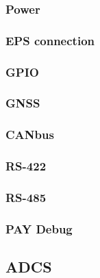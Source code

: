 \documentclass[10pt]{../datasheet}
\begin{document}
\subsubsection{Power}

\subsubsection{EPS connection}

\subsubsection{GPIO}

\subsubsection{GNSS}

\subsubsection{CANbus}

\subsubsection{RS-422}

\subsubsection{RS-485}

\subsubsection{PAY Debug}

\subsection{ADCS}
\end{document}
